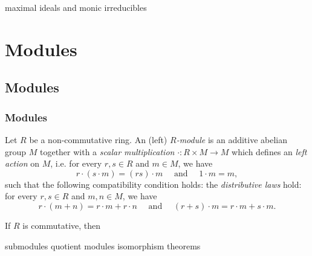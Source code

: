 \documentclass{../../large}
\begin{document}
maximal ideals and monic irreducibles






\part{Modules}



\chapter{Modules}
\section{Modules}

\begin{prb}
Let $R$ be a non-commutative ring.
An (left) \emph{$R$-module} is an additive abelian group $M$ together with a \emph{scalar multiplication} $\cdot:R\times M\to M$ which defines an \emph{left action} on $M$, i.e. for every $r,s\in R$ and $m\in M$, we have
\[r\cdot(s\cdot m)=(rs)\cdot m\quad\text{ and }\quad1\cdot m=m,\]
such that the following compatibility condition holds: the \emph{distributive laws} hold: for every $r,s\in R$ and $m,n\in M$, we have
\[r\cdot (m+n)=r\cdot m+r\cdot n\quad\text{ and }\quad(r+s)\cdot m=r\cdot m+s\cdot m.\]
\begin{parts}
\item If $R$ is commutative, then
\end{parts}
\end{prb}

submodules
quotient modules
isomorphism theorems
\end{document}
